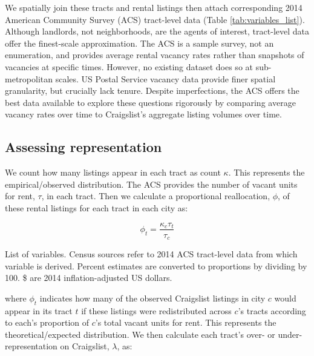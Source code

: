 \documentclass[11pt,letterpaper]{article}
\begin{document}
We spatially join these tracts and rental listings then attach corresponding 2014 American Community Survey (ACS) tract-level data (Table \ref{tab:variables_list}). Although landlords, not neighborhoods, are the agents of interest, tract-level data offer the finest-scale approximation. The ACS is a sample survey, not an enumeration, and provides average rental vacancy rates rather than snapshots of vacancies at specific times. However, no existing dataset does so at sub-metropolitan scales. US Postal Service vacancy data provide finer spatial granularity, but crucially lack tenure. Despite imperfections, the ACS offers the best data available to explore these questions rigorously by comparing average vacancy rates over time to Craigslist's aggregate listing volumes over time.


\subsection{Assessing representation}

We count how many listings appear in each tract as count $\kappa$. This represents the empirical/observed distribution. The ACS provides the number of vacant units for rent, $\tau$, in each tract. Then we calculate a proportional reallocation, $\phi$, of these rental listings for each tract in each city as:

\begin{equation}
	\label{eq:allocation}
	\phi_t = \frac{\kappa_c \tau_t}{\tau_c}
\end{equation}

\begin{table}[htbp]
	\centering
	\small
	\caption{List of variables. Census sources refer to 2014 ACS tract-level data from which variable is derived. Percent estimates are converted to proportions by dividing by 100. \$ are 2014 inflation-adjusted US dollars.}
	\label{tab:variables_list}
	
\end{table}

where $\phi_t$ indicates how many of the observed Craigslist listings in city $c$ would appear in its tract $t$ if these listings were redistributed across $c$'s tracts according to each's proportion of $c$'s total vacant units for rent. This represents the theoretical/expected distribution. We then calculate each tract's over- or under-representation on Craigslist, $\lambda$, as:
\end{document}
